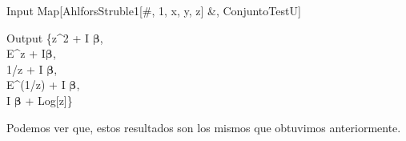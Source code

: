 \begin{mmaCell}{Input}
	 Map[AhlforsStruble1[#, 1, {x, y, z}] &, ConjuntoTestU]
\end{mmaCell}
\begin{mmaCell}{Output}
	 \{z^2 + I \(\pmb{\beta}\),\\ E^z + I\(\pmb{\beta}\),\\ 1/z + I \(\pmb{\beta}\),\\ E^(1/z) + I \(\pmb{\beta}\),\\ I \(\pmb{\beta}\) + Log[z]\}
\end{mmaCell}
\noindent Podemos ver que, estos resultados son los mismos que obtuvimos anteriormente.





















 